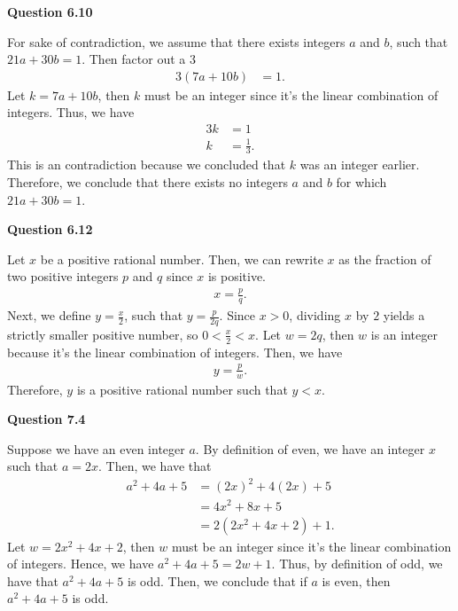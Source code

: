 \documentclass[12pt]{article}
\begin{document}
\vspace{20pt}

\noindent \textbf{Question 6.10}

For sake of contradiction, we assume that there exists integers $a$ and $b$, such that $21a+30b=1$.
Then factor out a 3
\begin{align*}
    3(7a + 10b) & = 1.
\end{align*}
Let $k = 7a+10b$, then $k$ must be an integer since it's the linear combination of integers.
Thus, we have
\begin{align*}
    3k & = 1            \\
    k  & = \frac{1}{3}.
\end{align*}
This is an contradiction because we concluded that $k$ was an integer earlier.
Therefore, we conclude that there exists no integers $a$ and $b$ for which $21a + 30b = 1$.

\vspace{20pt}

\noindent \textbf{Question 6.12}

Let $x$ be a positive rational number.
Then, we can rewrite $x$ as the fraction of two positive integers $p$ and $q$ since $x$ is positive.
\begin{align*}
    x = \frac{p}{q}.
\end{align*}
Next, we define $y = \frac{x}{2}$, such that $y = \frac{p}{2q}$.
Since $x > 0$, dividing $x$ by $2$ yields a strictly smaller positive number, so $0 < \frac{x}{2} < x$.
Let $w = 2q$, then $w$ is an integer because it's the linear combination of integers.
Then, we have
\begin{align*}
    y = \frac{p}{w}.
\end{align*}
Therefore, $y$ is a positive rational number such that $y < x$.

\vspace{20pt}

\noindent \textbf{Question 7.4}

Suppose we have an even integer $a$.
By definition of even, we have an integer $x$ such that $a = 2x$.
Then, we have that
\begin{align*}
    a^2 + 4a + 5 & = (2x)^2 + 4(2x) + 5   \\
                 & = 4x^2 + 8x + 5        \\
                 & = 2(2x^2 +4x + 2) + 1.
\end{align*}
Let $w = 2x^2 +4x + 2$, then $w$ must be an integer since it's the linear combination of integers.
Hence, we have $a^2 + 4a + 5 = 2w + 1$.
Thus, by definition of odd, we have that $a^2 + 4a + 5$ is odd.
Then, we conclude that if $a$ is even, then $a^2 + 4a + 5$ is odd.
\end{document}
